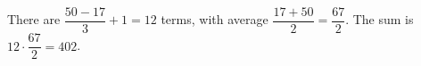 There are $\dfrac{50-17}{3}+1=12$ terms, with average $\dfrac{17+50}{2}=\dfrac{67}{2}$. The sum is $12\cdot\dfrac{67}{2}=\boxed{402}$.
